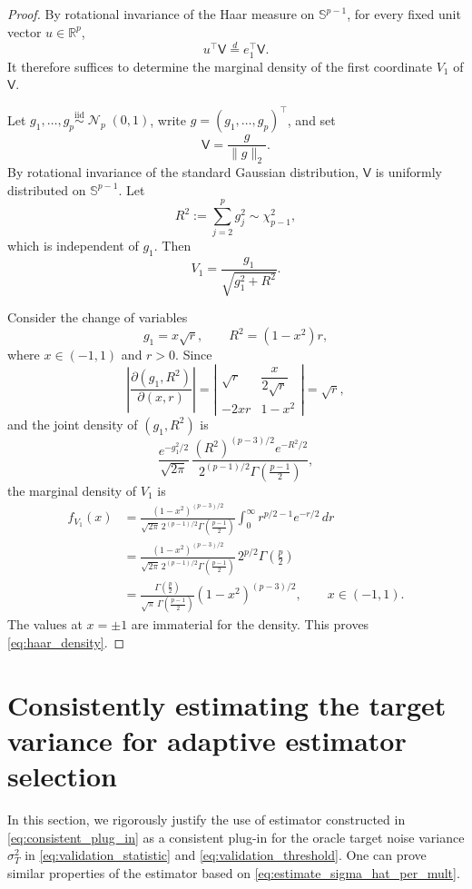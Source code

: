 \documentclass[10pt]{article}
\DeclareMathOperator{\dnorm}{\mathcal N}
\newcommand{\trg}{T}
\newcommand{\sigmaT}{\sigma_{\trg}}
\begin{document}
\begin{proof}
By rotational invariance of the Haar measure on \(\mathbb S^{p-1}\), for every
fixed unit vector \(u\in\mathbb R^p\),
\[
    u^\top \mathsf V\stackrel{d}{=}e_1^\top\mathsf V.
\]
It therefore suffices to determine the marginal density of the first
coordinate \(V_1\) of \(\mathsf V\).

Let \(g_1,\ldots,g_p\stackrel{\mathrm{iid}}{\sim}\dnorm_p(0,1)\), write
\(g=(g_1,\ldots,g_p)^\top\), and set
\[
    \mathsf V=\frac{g}{\|g\|_2}.
\]
By rotational invariance of the standard Gaussian distribution,
\(\mathsf V\) is uniformly distributed on \(\mathbb S^{p-1}\). Let
\[
    R^2:=\sum_{j=2}^p g_j^2\sim\chi^2_{p-1},
\]
which is independent of \(g_1\). Then
\[
    V_1=\frac{g_1}{\sqrt{g_1^2+R^2}}.
\]

Consider the change of variables
\[
    g_1=x\sqrt{r},\qquad
    R^2=(1-x^2)r,
\]
where \(x\in(-1,1)\) and \(r>0\). Since
\[
    \left|
    \frac{\partial(g_1,R^2)}{\partial(x,r)}
    \right|
    =
    \left|
    \begin{matrix}
        \sqrt r & \dfrac{x}{2\sqrt r}\\[1ex]
        -2xr & 1-x^2
    \end{matrix}
    \right|
    =\sqrt r,
\]
and the joint density of \((g_1,R^2)\) is
\[
    \frac{e^{-g_1^2/2}}{\sqrt{2\pi}}\,
    \frac{(R^2)^{(p-3)/2}e^{-R^2/2}}
    {2^{(p-1)/2}\Gamma\!\left(\frac{p-1}{2}\right)},
\]
the marginal density of \(V_1\) is
\begin{align*}
    f_{V_1}(x)
    &=
    \frac{(1-x^2)^{(p-3)/2}}
    {\sqrt{2\pi}\,2^{(p-1)/2}
    \Gamma\!\left(\frac{p-1}{2}\right)}
    \int_0^\infty r^{p/2-1}e^{-r/2}\,dr\\
    &=
    \frac{(1-x^2)^{(p-3)/2}}
    {\sqrt{2\pi}\,2^{(p-1)/2}
    \Gamma\!\left(\frac{p-1}{2}\right)}
    \,2^{p/2}\Gamma\!\left(\frac p2\right)\\
    &=
    \frac{\Gamma\!\left(\frac p2\right)}
    {\sqrt{\pi}\,\Gamma\!\left(\frac{p-1}{2}\right)}
    (1-x^2)^{(p-3)/2},
    \qquad x\in(-1,1).
\end{align*}
The values at \(x=\pm1\) are immaterial for the density. This proves
\eqref{eq:haar_density}.
\end{proof}

\section{Consistently estimating the target variance for adaptive estimator selection}
\label{sec:consistency_sigmaT_hat}
In this section, we rigorously justify the use of estimator constructed in \eqref{eq:consistent_plug_in} as a consistent plug-in for the oracle target noise variance $\sigmaT^2$ in \eqref{eq:validation_statistic} and \eqref{eq:validation_threshold}. One can prove similar properties of the estimator based on \eqref{eq:estimate_sigma_hat_per_mult}.
\end{document}

